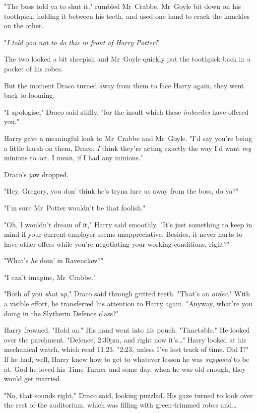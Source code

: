 "The boss told ya to shut it," rumbled Mr~Crabbe. Mr~Goyle bit down on his
toothpick, holding it between his teeth, and used one hand to crack the
knuckles on the other.

"\emph{I told you not to do this in front of Harry Potter!}"

The two looked a bit sheepish and Mr~Goyle quickly put the toothpick back in a
pocket of his robes.

But the moment Draco turned away from them to face Harry again, they went back
to looming.

"I apologise," Draco said stiffly, "for the insult which these \emph{imbeciles}
have offered you."

Harry gave a meaningful look to Mr~Crabbe and Mr~Goyle. "I’d say you’re being
a little harsh on them, Draco. \emph{I} think they’re acting exactly the way
I’d want \emph{my} minions to act. I mean, if I had any minions."

Draco’s jaw dropped.

"Hey, Gregory, you don’ think he’s tryna lure us away from the boss, do ya?"

"I’m sure Mr~Potter wouldn’t be that foolish."

"Oh, I wouldn’t dream of it," Harry said smoothly. "It’s just something to keep
in mind if your current employer seems unappreciative. Besides, it never hurts
to have other offers while you’re negotiating your working conditions, right?"

"What’s \emph{he} doin’ in Ravenclaw?"

"I can’t imagine, Mr~Crabbe."

"Both of you \emph{shut up}," Draco said through gritted teeth. "That’s an
\emph{order}." With a visible effort, he transferred his attention to Harry
again. "Anyway, what’re you doing in the Slytherin Defence class?"

Harry frowned. "Hold on." His hand went into his pouch. "Timetable." He looked
over the parchment. "Defence, 2:30pm, and right now it’s…" Harry looked
at his mechanical watch, which read 11:23. "2:23, unless I’ve lost track of
time. Did I?" If he had, well, Harry knew how to get to whatever lesson he was
\emph{supposed} to be at. God he loved his Time-Turner and some day, when he was
old enough, they would get married.

"No, that sounds right," Draco said, looking puzzled. His gaze turned to look
over the rest of the auditorium, which was filling with green-trimmed robes
and…

